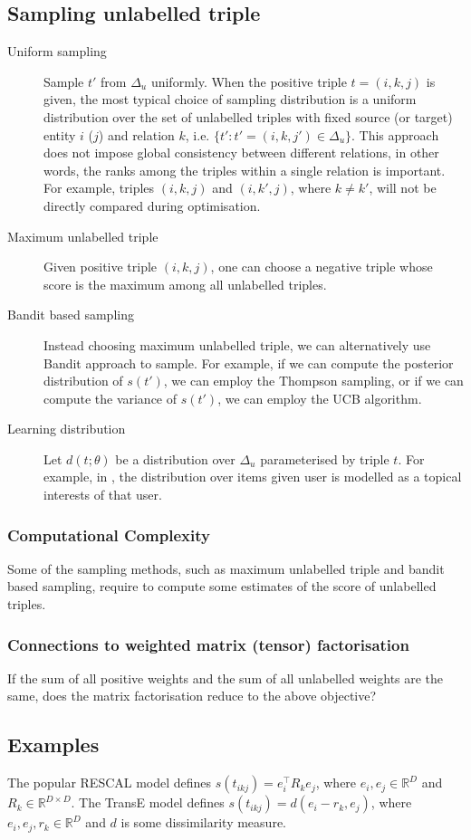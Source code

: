 \documentclass{article}
\theoremstyle{definition}
\begin{document}
\subsection{Sampling unlabelled triple}
\begin{description}
\item[Uniform sampling] Sample $t'$ from $\Delta_u$ uniformly. When the positive triple $t = (i,k,j)$ is given, the most typical choice of sampling distribution is a uniform distribution over the set of unlabelled triples with fixed source (or target) entity $i$ ($j$) and relation $k$, i.e. $\{t':t'=(i,k,j') \in \Delta_u\}$. This approach does not impose global consistency between different relations, in other words, the ranks among the triples within a single relation is important. For example, triples $(i,k,j)$ and $(i,k',j)$, where $k \neq k'$, will not be directly compared during optimisation.
\item[Maximum unlabelled triple] Given positive triple $(i,k,j)$, one can choose a negative triple whose score is the maximum among all unlabelled triples.
\item[Bandit based sampling] Instead choosing maximum unlabelled triple, we can alternatively use Bandit approach to sample. For example, if we can compute the posterior distribution of $s(t')$, we can employ the Thompson sampling, or if we can compute the variance of $s(t')$, we can employ the UCB algorithm.
\item[Learning distribution] Let $d(t;\theta)$ be a distribution over $\Delta_u$ parameterised by triple $t$. For example, in \cite{}, the distribution over items given user is modelled as a topical interests of that user.
\end{description}

\subsubsection{Computational Complexity}
Some of the sampling methods, such as maximum unlabelled triple and bandit based sampling, require to compute some estimates of the score of unlabelled triples.

\subsubsection{Connections to weighted matrix (tensor) factorisation}
If the sum of all positive weights and the sum of all unlabelled weights are the same, does the matrix factorisation reduce to the above objective?

\subsection{Examples}
The popular RESCAL model defines $s(t_{ikj}) = e_i^\top R_k e_j$, where $e_i, e_j \in \mathbb{R}^{D}$ and $R_k \in \mathbb{R}^{D\times D}$. The TransE model defines $s(t_{ikj}) = d(e_i - r_k, e_j)$, where $e_i, e_j, r_k \in \mathbb{R}^{D}$ and $d$ is some dissimilarity measure. 




\end{document}
